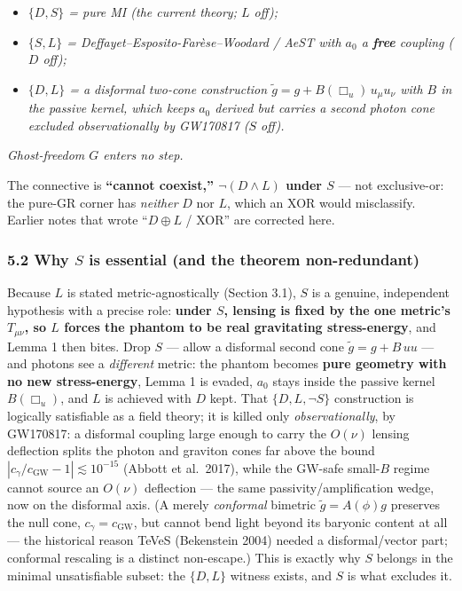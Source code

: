 \documentclass[
]{article}
\providecommand{\tightlist}{%
  \setlength{\itemsep}{0pt}\setlength{\parskip}{0pt}}
\begin{document}
\begin{itemize}
\tightlist
\item
  \emph{\(\{D,S\}\) = pure MI (the current theory; \(L\) off);}
\item
  \emph{\(\{S,L\}\) = Deffayet--Esposito-Farèse--Woodard / AeST with
  \(a_0\) a \textbf{free} coupling (\(D\) off);}
\item
  \emph{\(\{D,L\}\) = a disformal two-cone construction
  \(\tilde g=g+B(\Box_u)\,u_\mu u_\nu\) with \(B\) in the passive
  kernel, which keeps \(a_0\) derived but carries a second photon cone
  excluded observationally by GW170817 (\(S\) off).}
\end{itemize}

\emph{Ghost-freedom \(G\) enters no step.}

The connective is \textbf{``cannot coexist,'' \(\lnot(D\wedge L)\) under
\(S\)} --- not exclusive-or: the pure-GR corner has \emph{neither} \(D\)
nor \(L\), which an XOR would misclassify. Earlier notes that wrote
``\(D\oplus L\) / XOR'' are corrected here.

\subsubsection{\texorpdfstring{5.2 Why \(S\) is essential (and the
theorem
non-redundant)}{5.2 Why S is essential (and the theorem non-redundant)}}\label{why-s-is-essential-and-the-theorem-non-redundant}

Because \(L\) is stated metric-agnostically (Section 3.1), \(S\) is a
genuine, independent hypothesis with a precise role: \textbf{under
\(S\), lensing is fixed by the one metric's \(T_{\mu\nu}\), so \(L\)
forces the phantom to be real gravitating stress-energy}, and Lemma 1
then bites. Drop \(S\) --- allow a disformal second cone
\(\tilde g=g+B\,u u\) --- and photons see a \emph{different} metric: the
phantom becomes \textbf{pure geometry with no new stress-energy}, Lemma
1 is evaded, \(a_0\) stays inside the passive kernel \(B(\Box_u)\), and
\(L\) is achieved with \(D\) kept. That \(\{D,L,\lnot S\}\) construction
is logically satisfiable as a field theory; it is killed only
\emph{observationally}, by GW170817: a disformal coupling large enough
to carry the \(O(\nu)\) lensing deflection splits the photon and
graviton cones far above the bound
\(|c_\gamma/c_\mathrm{GW}-1|\lesssim10^{-15}\) (Abbott et al.~2017), while
the GW-safe small-\(B\) regime cannot source an \(O(\nu)\) deflection
--- the same passivity/amplification wedge, now on the disformal axis.
(A merely \emph{conformal} bimetric \(\tilde g=A(\phi)g\) preserves the
null cone, \(c_\gamma=c_\mathrm{GW}\), but cannot bend light beyond its
baryonic content at all --- the historical reason TeVeS (Bekenstein
2004) needed a disformal/vector part; conformal rescaling is a distinct
non-escape.) This is exactly why \(S\) belongs in the minimal
unsatisfiable subset: the \(\{D,L\}\) witness exists, and \(S\) is what
excludes it.
\end{document}
